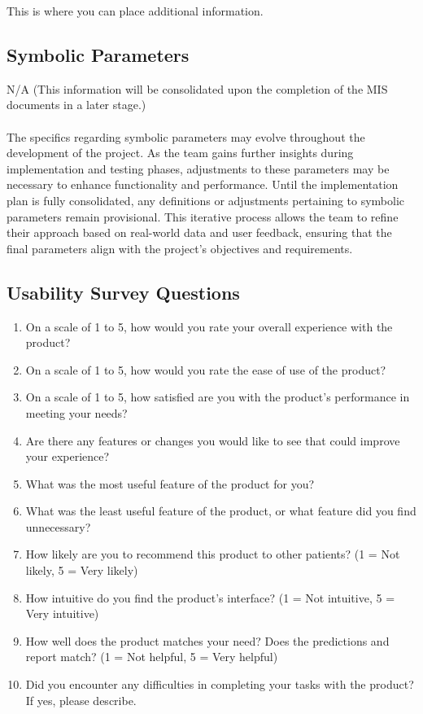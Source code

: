 \documentclass[12pt, titlepage]{article}
\begin{document}
This is where you can place additional information.

\subsection{Symbolic Parameters}

N/A (This information will be consolidated upon the completion of the MIS documents in a later stage.)\\\\
The specifics regarding symbolic parameters may evolve throughout the development of the project. As the team gains further insights during implementation and testing phases, adjustments to these parameters may be necessary to enhance functionality and performance. Until the implementation plan is fully consolidated, any definitions or adjustments pertaining to symbolic parameters remain provisional. This iterative process allows the team to refine their approach based on real-world data and user feedback, ensuring that the final parameters align with the project's objectives and requirements.


\subsection{Usability Survey Questions}

\begin{enumerate}
    \item On a scale of 1 to 5, how would you rate your overall experience with the product?
    \item On a scale of 1 to 5, how would you rate the ease of use of the product?
    \item On a scale of 1 to 5, how satisfied are you with the product's performance in meeting your needs?
    \item Are there any features or changes you would like to see that could improve your experience?
    \item What was the most useful feature of the product for you?
    \item What was the least useful feature of the product, or what feature did you find unnecessary?
    \item How likely are you to recommend this product to other patients? (1 = Not likely, 5 = Very likely)
    \item How intuitive do you find the product’s interface? (1 = Not intuitive, 5 = Very intuitive)
    \item How well does the product matches your need? Does the predictions and report match? (1 = Not helpful, 5 = Very helpful)
    \item Did you encounter any difficulties in completing your tasks with the product? If yes, please describe.
\end{enumerate}
\end{document}
